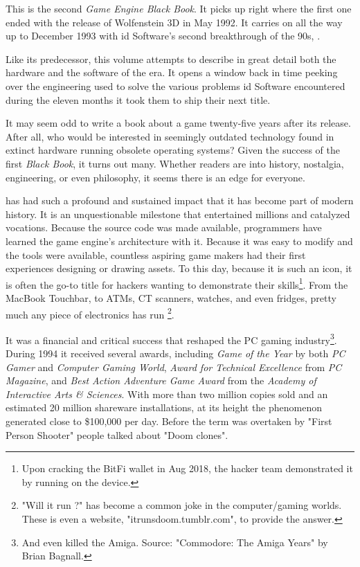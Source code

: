 This is the second \textit{Game Engine Black Book}. It picks up right where the first one ended with the release of Wolfenstein 3D in May 1992. It carries on all the way up to December 1993 with id Software's second breakthrough of the 90s, \doom{}.\\ %
\par
 Like its predecessor, this volume attempts to describe in great detail both the hardware and the software of the era. It opens a window back in time peeking over the engineering used to solve the various problems id Software encountered during the eleven months it took them to ship their next title.\\%
\par
It may seem odd to write a book about a game twenty-five years after its release. After all, who would be interested in seemingly outdated technology found in extinct hardware running obsolete operating systems? Given the success of the first \textit{Black Book}, it turns out many. Whether readers are into history, nostalgia, engineering, or even philosophy, it seems there is an edge for everyone.\\ 

\par
\doom{} has had such a profound and sustained impact that it has become part of modern history. It is an unquestionable milestone that entertained millions and catalyzed vocations. Because the source code was made available, programmers have learned the game engine's architecture with it. Because it was easy to modify and the tools were available, countless aspiring game makers had their first experiences designing or drawing assets. To this day, because it is such an icon, it is often the go-to title for hackers wanting to demonstrate their skills\footnote{Upon cracking the BitFi wallet in Aug 2018, the hacker team demonstrated it by running \doom{} on the device.}. From the MacBook Touchbar, to ATMs, CT scanners, watches, and even fridges, pretty much any piece of electronics has run \doom{} \footnote{ "Will it run \doom{}?" has become a common joke in the computer/gaming worlds. These is even a website, "itrunsdoom.tumblr.com", to provide the answer.}.\\
\par

It was a financial and critical success that reshaped the PC gaming industry\footnote{And even killed the Amiga. Source: "Commodore: The Amiga Years" by Brian Bagnall.}. During 1994 it received several awards, including \textit{Game of the Year} by both \textit{PC Gamer} and \textit{Computer Gaming World}, \textit{Award for Technical Excellence} from \textit{PC Magazine}, and \textit{Best Action Adventure Game Award} from the \textit{Academy of Interactive Arts \& Sciences}. With more than two million copies sold and an estimated 20 million shareware installations, at its height the phenomenon generated close to \$100,000 per day. Before the term was overtaken by "First Person Shooter" people talked about "Doom clones".\\
\par


